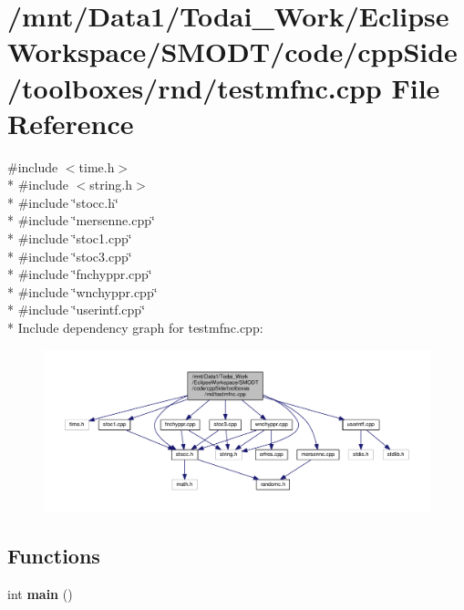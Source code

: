 \section{/mnt/\-Data1/\-Todai\-\_\-\-Work/\-Eclipse\-Workspace/\-S\-M\-O\-D\-T/code/cpp\-Side/toolboxes/rnd/testmfnc.cpp File Reference}
\label{toolboxes_2rnd_2testmfnc_8cpp}
{\ttfamily \#include $<$time.\-h$>$}\\*
{\ttfamily \#include $<$string.\-h$>$}\\*
{\ttfamily \#include \char`\"{}stocc.\-h\char`\"{}}\\*
{\ttfamily \#include \char`\"{}mersenne.\-cpp\char`\"{}}\\*
{\ttfamily \#include \char`\"{}stoc1.\-cpp\char`\"{}}\\*
{\ttfamily \#include \char`\"{}stoc3.\-cpp\char`\"{}}\\*
{\ttfamily \#include \char`\"{}fnchyppr.\-cpp\char`\"{}}\\*
{\ttfamily \#include \char`\"{}wnchyppr.\-cpp\char`\"{}}\\*
{\ttfamily \#include \char`\"{}userintf.\-cpp\char`\"{}}\\*
Include dependency graph for testmfnc.\-cpp\-:
\nopagebreak
\begin{figure}[H]
\begin{center}
\leavevmode
\includegraphics[width=350pt]{toolboxes_2rnd_2testmfnc_8cpp__incl}
\end{center}
\end{figure}
\subsection*{Functions}
\begin{DoxyCompactItemize}
\item 
int {\bf main} ()
\end{DoxyCompactItemize}
